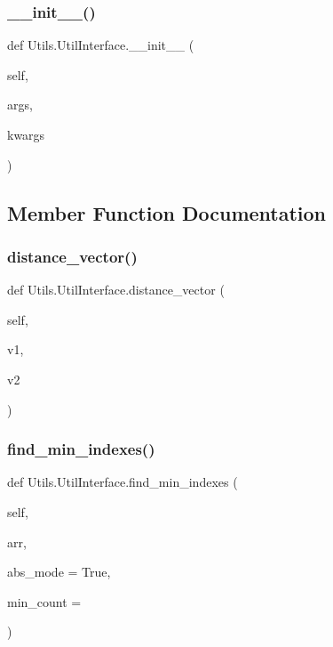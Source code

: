 \subsubsection{\texorpdfstring{\+\_\+\+\_\+init\+\_\+\+\_\+()}{\_\_init\_\_()}}
{\footnotesize\ttfamily def Utils.\+Util\+Interface.\+\_\+\+\_\+init\+\_\+\+\_\+ (\begin{DoxyParamCaption}\item[{}]{self,  }\item[{}]{args,  }\item[{}]{kwargs }\end{DoxyParamCaption})}



\subsection{Member Function Documentation}
\mbox{\label{classUtils_1_1UtilInterface_a11a56686a81620284e09482768cc2a96}} 
\subsubsection{\texorpdfstring{distance\+\_\+vector()}{distance\_vector()}}
{\footnotesize\ttfamily def Utils.\+Util\+Interface.\+distance\+\_\+vector (\begin{DoxyParamCaption}\item[{}]{self,  }\item[{}]{v1,  }\item[{}]{v2 }\end{DoxyParamCaption})}

\mbox{\label{classUtils_1_1UtilInterface_a7b41165f128c553847891855f80dd725}} 
\subsubsection{\texorpdfstring{find\+\_\+min\+\_\+indexes()}{find\_min\_indexes()}}
{\footnotesize\ttfamily def Utils.\+Util\+Interface.\+find\+\_\+min\+\_\+indexes (\begin{DoxyParamCaption}\item[{}]{self,  }\item[{}]{arr,  }\item[{}]{abs\+\_\+mode = {\ttfamily True},  }\item[{}]{min\+\_\+count = {} }\end{DoxyParamCaption})}

